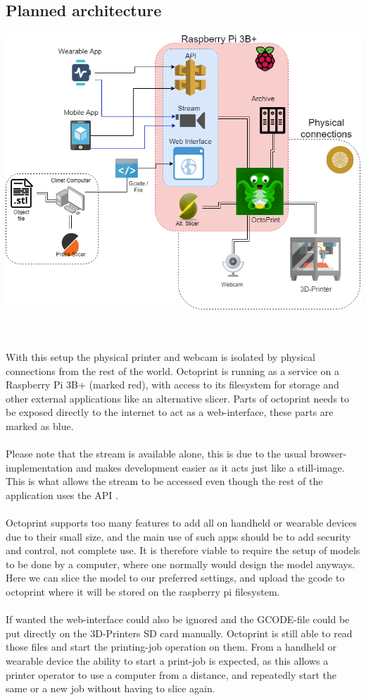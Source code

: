 \documentclass[a4paper, 12pt]{article}
\newcommand{\mysubsection}[1]{\subsection*{#1} \addcontentsline{toc}{subsection}{#1}}
\begin{document}
    \mysubsection{Planned architecture}
    \centerline{\includegraphics[scale=0.5]{figures/TizenPrint-architecture.png}}
    \\\\
    With this setup the physical printer and webcam is isolated by physical connections from the rest of the
    world.
    Octoprint is running as a service on a Raspberry Pi 3B+ (marked red), with access to its filesystem for storage and other
    external applications like an alternative slicer.
    Parts of octoprint needs to be exposed directly to the internet to act as a web-interface, these parts are marked as
    blue.
    \\\\
    Please note that the stream is available alone, this is due to the usual browser-implementation and makes development
    easier as it acts just like a still-image.
    This is what allows the stream to be accessed even though the rest of the application uses the API .
    \\\\
    Octoprint supports too many features to add all on handheld or wearable devices due to their small size, and the
    main use of such apps should be to add security and control, not complete use.
    It is therefore viable to require the setup of models to be done by a computer, where one normally would design
    the model anyways.
    Here we can slice the model to our preferred settings, and upload the gcode to octoprint where it will be stored on
    the raspberry pi filesystem.
    \\\\
    If wanted the web-interface could also be ignored and the GCODE-file could be put directly on the 3D-Printers SD card
    manually.
    Octoprint is still able to read those files and start the printing-job operation on them.
    From a handheld or wearable device the ability to start a print-job is expected, as this allows a printer operator
    to use a computer from a distance, and repeatedly start the same or a new job without having to slice again.
\end{document}
